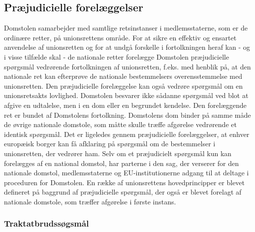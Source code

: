 \documentclass[]{book}
\begin{document}
\hypertarget{prjudicielle-forelggelser}{%
\subsection{Præjudicielle forelæggelser}\label{prjudicielle-forelggelser}}

Domstolen samarbejder med samtlige retsinstanser i medlemsstaterne, som er de ordinære retter, på unionsrettens område. For at sikre en effektiv og ensartet anvendelse af unionsretten og for at undgå forskelle i fortolkningen heraf kan - og i visse tilfælde skal - de nationale retter forelægge Domstolen præjudicielle spørgsmål vedrørende fortolkningen af unionsretten, f.eks. med henblik på, at den nationale ret kan efterprøve de nationale bestemmelsers overensstemmelse med unionsretten. Den præjudicielle forelæggelse kan også vedrøre spørgsmål om en unionsretsakts lovlighed.
Domstolen besvarer ikke sådanne spørgsmål ved blot at afgive en udtalelse, men i en dom eller en begrundet kendelse. Den forelæggende ret er bundet af Domstolens fortolkning. Domstolens dom binder på samme måde de øvrige nationale domstole, som måtte skulle træffe afgørelse vedrørende et identisk spørgsmål.
Det er ligeledes gennem præjudicielle forelæggelser, at enhver europæisk borger kan få afklaring på spørgsmål om de bestemmelser i unionsretten, der vedrører ham. Selv om et præjudicielt spørgsmål kun kan forelægges af en national domstol, har parterne i den sag, der verserer for den nationale domstol, medlemsstaterne og EU-institutionerne adgang til at deltage i proceduren for Domstolen. En række af unionsrettens hovedprincipper er blevet defineret på baggrund af præjudicielle spørgsmål, der også er blevet forelagt af nationale domstole, som træffer afgørelse i første instans.

\hypertarget{traktatbrudssgsmal}{%
\subsubsection{Traktatbrudssøgsmål}\label{traktatbrudssgsmal}}
\end{document}
